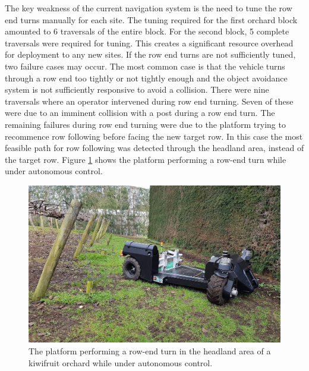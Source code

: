 \documentclass[preprint,authoryear,12pt]{elsarticle}
\begin{document}
    The key weakness of the current navigation system is the need to tune the row end turns manually for each site.
    The tuning required for the first orchard block amounted to 6 traversals of the entire block.
    For the second block, 5 complete traversals were required for tuning.
    This creates a significant resource overhead for deployment to any new sites.
    If the row end turns are not sufficiently tuned, two failure cases may occur.
    The most common case is that the vehicle turns through a row end too tightly or not tightly enough and the object avoidance system is not sufficiently responsive to avoid a collision.
    There were nine traversals where an operator intervened during row end turning.
    Seven of these were due to an imminent collision with a post during a row end turn.
    The remaining failures during row end turning were due to the platform trying to recommence row following before facing the new target row.
    In this case the most feasible path for row following was detected through the headland area, instead of the target row.
    Figure \ref{fig:suzy_turning} shows the platform performing a row-end turn while under autonomous control.

    \begin{figure}[htb]
        \centering
        \includegraphics[width=\linewidth]{imgs/photos/suzy_turning.jpg}
        \caption{
            The platform performing a row-end turn in the headland area of a kiwifruit orchard while under autonomous control.
        }
        \label{fig:suzy_turning}
    \end{figure}
\end{document}
